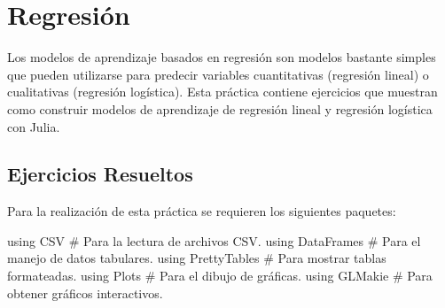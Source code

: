 \documentclass[
  a4paper,
]{scrreport}
\newenvironment{Shaded}{\begin{snugshade}}{\end{snugshade}}
\newcommand{\BuiltInTok}[1]{\textcolor[rgb]{0.00,0.23,0.31}{#1}}
\newcommand{\CommentTok}[1]{\textcolor[rgb]{0.37,0.37,0.37}{#1}}
\newcommand{\ImportTok}[1]{\textcolor[rgb]{0.00,0.46,0.62}{#1}}
\theoremstyle{definition}
\theoremstyle{remark}
\begin{document}

\chapter{Regresión}\label{regresiuxf3n}

Los modelos de aprendizaje basados en regresión son modelos bastante
simples que pueden utilizarse para predecir variables cuantitativas
(regresión lineal) o cualitativas (regresión logística). Esta práctica
contiene ejercicios que muestran como construir modelos de aprendizaje
de regresión lineal y regresión logística con Julia.

\section{Ejercicios Resueltos}\label{ejercicios-resueltos-1}

Para la realización de esta práctica se requieren los siguientes
paquetes:

\begin{Shaded}
\begin{Highlighting}[]
\ImportTok{using} \BuiltInTok{CSV}  \CommentTok{\# Para la lectura de archivos CSV.}
\ImportTok{using} \BuiltInTok{DataFrames}  \CommentTok{\# Para el manejo de datos tabulares.}
\ImportTok{using} \BuiltInTok{PrettyTables}  \CommentTok{\# Para mostrar tablas formateadas.}
\ImportTok{using} \BuiltInTok{Plots}  \CommentTok{\# Para el dibujo de gráficas.}
\ImportTok{using} \BuiltInTok{GLMakie}  \CommentTok{\# Para obtener gráficos interactivos.}
\end{Highlighting}
\end{Shaded}
\end{document}
